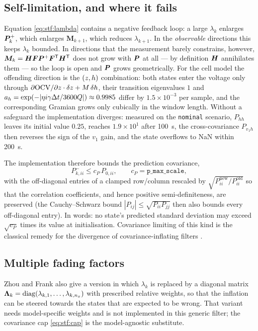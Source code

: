 \subsection{Self-limitation, and where it fails}
Equation \eqref{eq:stf:lambda} contains a negative feedback loop: a large $\lambda_k$ enlarges
$\bm{P}^{+}_k$, which enlarges $\bm{M}_{k+1}$, which reduces $\lambda_{k+1}$.  In the \emph{observable}
directions this keeps $\lambda_k$ bounded.  In directions that the measurement barely constrains,
however, $\bm{M}_k = \bm{H}\bm{F}\bm{P}^{+}\bm{F}^{\mathsf{T}}\bm{H}^{\mathsf{T}}$ does not grow with $\bm{P}$ at all --- by definition
$\bm{H}$ annihilates them --- so the loop is open and $\bm{P}$ grows geometrically.  For the cell model the
offending direction is the $(z,h)$ combination: both states enter the voltage only through
$\partial\mathrm{OCV}/\partial z\cdot\delta z + M\,\delta h$, their transition eigenvalues
$1$ and $a_h=\exp(-|\eta i \gamma \Delta t/3600Q|)\approx 0.9985$ differ by $1.5\times10^{-3}$ per
sample, and the corresponding Gramian grows only cubically in the window length.  Without a
safeguard the implementation diverges: measured on the \texttt{nominal} scenario, $P_{hh}$ leaves
its initial value $0.25$, reaches $1.9\times 10^{1}$ after \SI{100}{\second}, the cross-covariance
$P_{v_1 h}$ then reverses the sign of the $v_1$ gain, and the state overflows to NaN within
\SI{200}{\second}.

The implementation therefore bounds the prediction covariance,
\begin{equation}
P^-_{k,ii} \le c_P\,P_{0,ii}, \qquad c_P = \texttt{p\_max\_scale},
\label{eq:stf:cap}
\end{equation}
with the off-diagonal entries of a clamped row/column rescaled by
$\sqrt{P^{\text{new}}_{ii}/P^{\text{old}}_{ii}}$ so that the correlation coefficients, and hence
positive semi-definiteness, are preserved (the Cauchy--Schwarz bound
$|P_{ij}|\le\sqrt{P_{ii}P_{jj}}$ then also bounds every off-diagonal entry).  In words: no state's
predicted standard deviation may exceed $\sqrt{c_P}$ times its value at initialisation.  Covariance
limiting of this kind is the classical remedy for the divergence of covariance-inflating filters
\cite[Sec.~4.4]{andersonmoore1979}\cite[Sec.~7.4]{simon2006}.

\subsection{Multiple fading factors}
Zhou and Frank also give a version in which $\lambda_k$ is replaced by a diagonal matrix
$\bm\Lambda_k=\operatorname{diag}(\lambda_{k,1},\dots,\lambda_{k,n_x})$ with prescribed relative weights, so that
the inflation can be steered towards the states that are expected to be wrong.  That variant needs
model-specific weights and is not implemented in this generic filter; the covariance cap
\eqref{eq:stf:cap} is the model-agnostic substitute.

